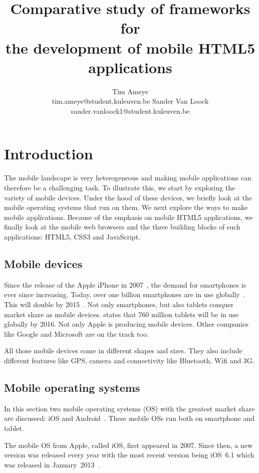 \documentclass[a4paper]{artikel3}
\title{Comparative study of frameworks for \\ the development of mobile HTML5 applications}
\author{Tim Ameye \\ tim.ameye@student.kuleuven.be \And Sander Van Loock \\ sander.vanloock1@student.kuleuven.be}
\begin{document}
\maketitle


\section{Introduction} %
\label{sec:introduction}
The mobile landscape is very heterogeneous and making mobile applications can therefore be a challenging task.
To illustrate this, we start by exploring the variety of mobile devices.
Under the hood of these devices, we briefly look at the mobile operating systems that run on them. 
We next explore the ways to make mobile applications.
Because of the emphasis on mobile HTML5 applications, we finally look at the mobile web browsers and the three building blocks of such applications: HTML5, CSS3 and JavaScript.

\subsection{Mobile devices}
Since the release of the Apple iPhone in 2007~\cite{David2011}, the demand for smartphones is ever since increasing. 
Today, over one billion smartphones are in use globally~\cite{Yang2012}.
This will double by 2015~\cite{Gillett2012}.
Not only smartphones, but also tablets conquer market share as mobile devices.
\cite{Gillett2012} states that 760 million tablets will be in use globally by 2016.
Not only Apple is producing mobile devices.
Other companies like Google and Microsoft are on the track too.

All those mobile devices come in different shapes and sizes.
They also include different features like GPS, camera and connectivity like Bluetooth, Wifi and 3G.

\subsection{Mobile operating systems}
In this section two mobile operating systems (OS) with the greatest market share are discussed: iOS and Android~\cite{David2011, Hales2012}.
These mobile OSs run both on smartphone and tablet.

The mobile OS from Apple, called iOS, first appeared in 2007.
Since then, a new version was released every year with the most recent version being iOS~6.1 which was released in January~2013~\cite{Deitel2012, PhilDutson2012, Apple2013}.
\end{document}
